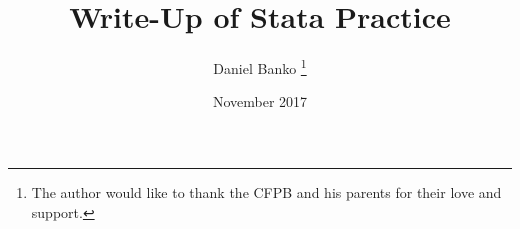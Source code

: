 \documentclass[12pt, letterpaper]{article}
\title{Write-Up of Stata Practice}
\author{Daniel Banko \thanks{The author would like to thank the CFPB and his parents for their love and support.}}
\date{November 2017}
\begin{document}
\begin{titlepage}
\maketitle
\end{titlepage}
\begin{table}

\end{table}
\end{document}
